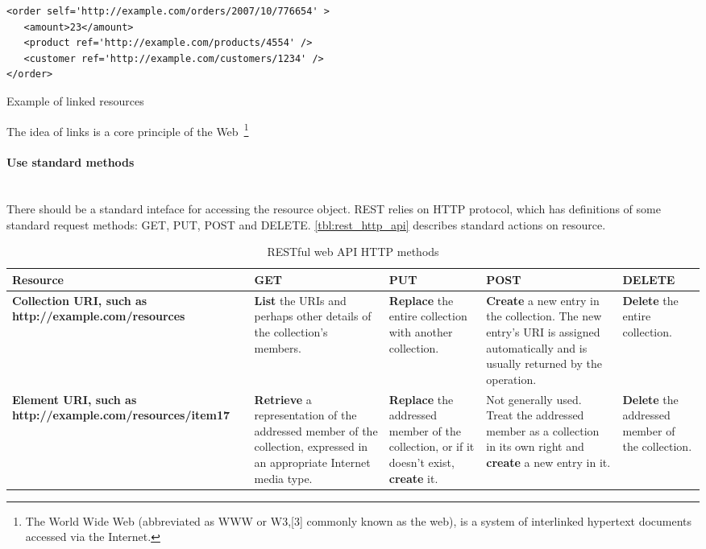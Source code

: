 \begin{listing}
\begin{verbatim}
<order self='http://example.com/orders/2007/10/776654' > 
   <amount>23</amount> 
   <product ref='http://example.com/products/4554' /> 
   <customer ref='http://example.com/customers/1234' /> 
</order> 
\end{verbatim}
\caption{Example of linked resources\cite{rest_brief_intro}}
\label{lst:linked_uri_example}
\end{listing}
 
The idea of links is a core principle of the Web~\footnote{The World Wide Web
(abbreviated as WWW or W3,[3] commonly known as the web), is a system of
interlinked hypertext documents accessed via the Internet.\cite{wikipedia:WWW}}

\paragraph{Use standard methods} ~\\

There should be a standard inteface for accessing the resource object.
REST relies on HTTP protocol, which has definitions of some standard request
methods:
GET, PUT, POST and DELETE.
\autoref{tbl:rest_http_api} describes standard actions on resource.

\begin{table}[h]
	\centering	
	\begin{tabularx}{\textwidth}{|X|X|X|X|X|}
		\hline
		\textbf{Resource} & 
		\textbf{GET}  	& 
		\textbf{PUT} 	&
		\textbf{POST} &
		\textbf{DELETE}
	    
	    \tabularnewline
		\hline
			\begin{sloppypar}
				\textbf{Collection URI, such as http://example.com/resources}
			\end{sloppypar} &
			\textbf{List} the URIs and perhaps other details of the collection's members.&
			\textbf{Replace} the entire collection with another collection.&
			\textbf{Create} a new entry in the collection. The new entry's URI is
			assigned automatically and is usually returned by the operation. &
			\textbf{Delete} the entire collection.
			
	    	\tabularnewline	    	
	    	\hline
	    	\begin{sloppypar}
				\textbf{Element URI, such as http://example.com/resources/item17} 
			\end{sloppypar} &
			\textbf{Retrieve} a representation of the addressed member of the
			collection, expressed in an appropriate Internet media type. &
			\textbf{Replace} the addressed member of the collection, or if it
			doesn't exist, \textbf{create} it. &			
			Not generally used. Treat the addressed member as a collection in its own
			right and \textbf{create} a new entry in it. &			
			\textbf{Delete} the addressed member of the collection.
	
	    \tabularnewline
		\hline	  
	\end{tabularx} 
	\caption{RESTful web API HTTP methods \cite{wikipedia:REST}}
	\label{tbl:rest_http_api}
\end{table}


